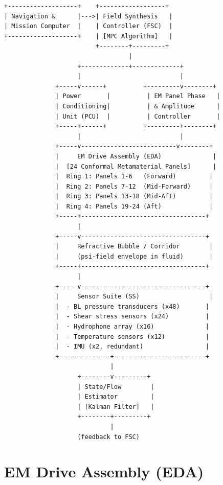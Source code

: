 \documentclass[11pt]{article}
\begin{document}
\begin{verbatim}
+-------------------+    +------------------+
| Navigation &      |--->| Field Synthesis   |
| Mission Computer  |    | Controller (FSC)  |
+-------------------+    | [MPC Algorithm]   |
                         +--------+---------+
                                  |
                    +-------------+-------------+
                    |                           |
              +-----v------+          +---------v--------+
              | Power       |          | EM Panel Phase   |
              | Conditioning|          | & Amplitude      |
              | Unit (PCU)  |          | Controller       |
              +-----+------+          +---------+--------+
                    |                           |
              +-----v--------------------------v--------+
              |     EM Drive Assembly (EDA)              |
              |  [24 Conformal Metamaterial Panels]      |
              |  Ring 1: Panels 1-6   (Forward)         |
              |  Ring 2: Panels 7-12  (Mid-Forward)     |
              |  Ring 3: Panels 13-18 (Mid-Aft)         |
              |  Ring 4: Panels 19-24 (Aft)             |
              +-----+----------------------------------+
                    |
              +-----v----------------------------------+
              |     Refractive Bubble / Corridor        |
              |     (psi-field envelope in fluid)       |
              +-----+----------------------------------+
                    |
              +-----v----------------------------------+
              |     Sensor Suite (SS)                   |
              |  - BL pressure transducers (x48)       |
              |  - Shear stress sensors (x24)          |
              |  - Hydrophone array (x16)              |
              |  - Temperature sensors (x12)           |
              |  - IMU (x2, redundant)                 |
              +--------------+-------------------------+
                             |
                    +--------v---------+
                    | State/Flow        |
                    | Estimator         |
                    | [Kalman Filter]   |
                    +--------+---------+
                             |
                    (feedback to FSC)
\end{verbatim}

\section{EM Drive Assembly (EDA)}
\label{sec:eda}
\end{document}
